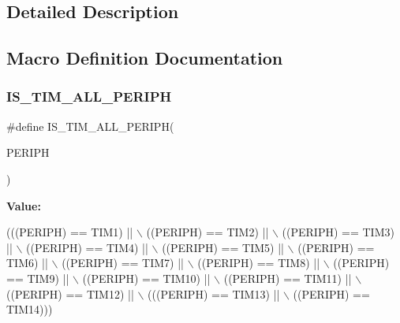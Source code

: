 \subsection{Detailed Description}


\subsection{Macro Definition Documentation}
\mbox{\label{group___t_i_m___exported__constants_ga71710da28a59c007a1d2ddee18a5ffcc}} 
\subsubsection{\texorpdfstring{I\+S\+\_\+\+T\+I\+M\+\_\+\+A\+L\+L\+\_\+\+P\+E\+R\+I\+PH}{IS\_TIM\_ALL\_PERIPH}}
{\footnotesize\ttfamily \#define I\+S\+\_\+\+T\+I\+M\+\_\+\+A\+L\+L\+\_\+\+P\+E\+R\+I\+PH(\begin{DoxyParamCaption}\item[{}]{P\+E\+R\+I\+PH }\end{DoxyParamCaption})}

{\bfseries Value\+:}
\begin{DoxyCode}
(((PERIPH) == TIM1) || \(\backslash\)
                                   ((PERIPH) == TIM2) || \(\backslash\)
                                   ((PERIPH) == TIM3) || \(\backslash\)
                                   ((PERIPH) == TIM4) || \(\backslash\)
                                   ((PERIPH) == TIM5) || \(\backslash\)
                                   ((PERIPH) == TIM6) || \(\backslash\)
                                   ((PERIPH) == TIM7) || \(\backslash\)
                                   ((PERIPH) == TIM8) || \(\backslash\)
                                   ((PERIPH) == TIM9) || \(\backslash\)
                                   ((PERIPH) == TIM10) || \(\backslash\)
                                   ((PERIPH) == TIM11) || \(\backslash\)
                                   ((PERIPH) == TIM12) || \(\backslash\)
                                   (((PERIPH) == TIM13) || \(\backslash\)
                                   ((PERIPH) == TIM14)))
\end{DoxyCode}


